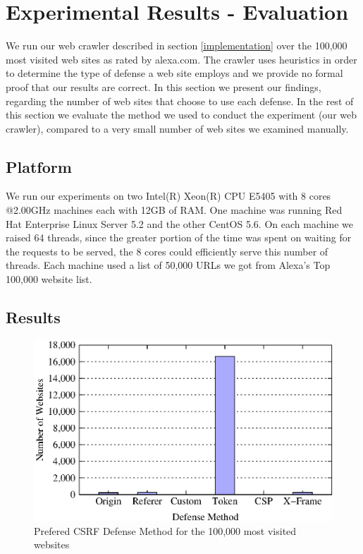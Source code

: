 \label{evaluation}
\section{Experimental Results - Evaluation}
We run our web crawler described in section \ref{implementation} over the 100,000 most visited web sites as
rated by alexa.com.  The crawler uses heuristics in order to determine the type of defense a web site employs and
we provide no formal proof that our results are correct.  In this section we present our findings, regarding the
number of web sites that choose to use each defense.  In the rest of this section we evaluate the method we
used to conduct the experiment (our web crawler), compared to a very small number of web sites we examined manually. 

\subsection{Platform} 
We run our experiments on two Intel(R) Xeon(R) CPU E5405 with 8 cores @2.00GHz machines each with 12GB of RAM. 
One machine was running Red Hat Enterprise Linux Server 5.2 and the other CentOS 5.6. 
On each machine we raised 64 threads, since the greater portion of the time was spent on waiting 
for the requests to be served, the 8 cores could efficiently serve this number of threads.  Each machine used a list 
of 50,000 URLs we got from Alexa's Top 100,000 website list.  

\subsection{Results}
\begin{figure}[htb]
	\includegraphics[scale=0.7]{figs/results_all}
	\caption{Prefered CSRF Defense Method for the 100,000 most visited websites}
	\label{fig:resultsAll}
\end{figure}

